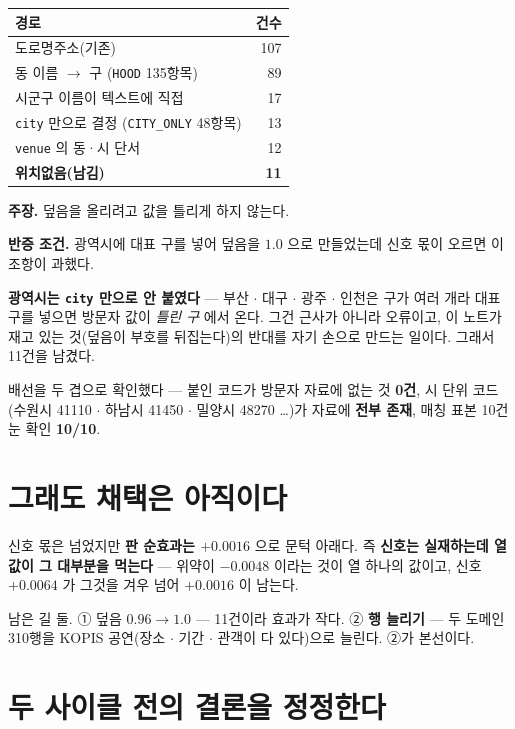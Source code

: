\documentclass[10pt,a4paper]{article}
\newcommand{\claim}[2]{\begin{claimbox}\textbf{주장.} #1\par\smallskip
  \textcolor{gray!70}{\textbf{반증 조건.} #2}\end{claimbox}}
\begin{document}
\begin{center}\small
\begin{tabular}{lr}\toprule
경로 & 건수 \\ \midrule
도로명주소(기존) & 107 \\
동 이름 $\to$ 구 (\texttt{HOOD} 135항목) & 89 \\
시군구 이름이 텍스트에 직접 & 17 \\
\texttt{city} 만으로 결정 (\texttt{CITY\_ONLY} 48항목) & 13 \\
\texttt{venue} 의 동·시 단서 & 12 \\ \midrule
\textbf{위치없음(남김)} & \textbf{11} \\ \bottomrule
\end{tabular}\end{center}

\claim{덮음을 올리려고 값을 틀리게 하지 않는다.}{광역시에 대표 구를 넣어
덮음을 $1.0$ 으로 만들었는데 신호 몫이 오르면 이 조항이 과했다.}

\textbf{광역시는 \texttt{city} 만으로 안 붙였다} --- 부산 $\cdot$ 대구 $\cdot$
광주 $\cdot$ 인천은 구가 여러 개라 대표 구를 넣으면 방문자 값이 \emph{틀린 구}
에서 온다. 그건 근사가 아니라 오류이고, 이 노트가 재고 있는 것(덮음이 부호를
뒤집는다)의 반대를 자기 손으로 만드는 일이다. 그래서 11건을 남겼다.

배선을 두 겹으로 확인했다 --- 붙인 코드가 방문자 자료에 없는 것 \textbf{0건},
시 단위 코드(수원시 41110 $\cdot$ 하남시 41450 $\cdot$ 밀양시 48270 …)가 자료에
\textbf{전부 존재}, 매칭 표본 10건 눈 확인 \textbf{10/10}.

\section{그래도 채택은 아직이다}

신호 몫은 넘었지만 \textbf{판 순효과는 $+0.0016$} 으로 문턱 아래다. 즉
\textbf{신호는 실재하는데 열값이 그 대부분을 먹는다} --- 위약이 $-0.0048$ 이라는
것이 열 하나의 값이고, 신호 $+0.0064$ 가 그것을 겨우 넘어 $+0.0016$ 이 남는다.

남은 길 둘. ① 덮음 $0.96 \to 1.0$ --- 11건이라 효과가 작다. ② \textbf{행 늘리기}
--- 두 도메인 310행을 KOPIS 공연(장소 $\cdot$ 기간 $\cdot$ 관객이 다 있다)으로
늘린다. ②가 본선이다.

\section{두 사이클 전의 결론을 정정한다}
\end{document}
